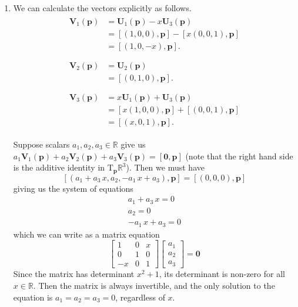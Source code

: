 \documentclass[12 pt, letterpaper]{hmcpset}
\begin{document}
\begin{solution}
	\begin{enumerate}
		\item 
			We can calculate the vectors explicitly as follows.
			\[
				\begin{gathered}
					\begin{split}
						\mathbf V_1(\mathbf p) & = \mathbf U_1(\mathbf p) - x \mathbf U_3(\mathbf p) \\
								       & = [(1, 0, 0), \mathbf p] - [x (0, 0, 1), \mathbf p] \\
								       & = [(1, 0, - x), \mathbf p].
					\end{split}\\\\
					\begin{split}
						\mathbf V_2(\mathbf p) & = \mathbf U_2(\mathbf p) \\
								       & = [(0, 1, 0), \mathbf p].
					\end{split}\\\\
					\begin{split}
						\mathbf V_3(\mathbf p) & = x \mathbf U_1(\mathbf p) + \mathbf U_3(\mathbf p) \\
								       & = [x (1, 0, 0), \mathbf p] + [(0, 0, 1), \mathbf p] \\
								       & = [(x, 0, 1), \mathbf p].
					\end{split}
				\end{gathered}
			\]

			Suppose scalars $a_1, a_2, a_3 \in \mathbb R$ give us $a_1 \mathbf V_1(\mathbf p) + a_2 \mathbf V_2(\mathbf p) + a_3 \mathbf V_3(\mathbf p) = [\mathbf 0, \mathbf p]$ (note that the right hand side is the additive identity in $\mathrm T_{\mathbf p} \mathbb R^3$). Then we must have
			\[
				[(a_1 + a_3 \, x, a_2, - a_1 \, x + a_3), \mathbf p] = [(0, 0, 0), \mathbf p]
			\]
			giving us the system of equations
			\[
				\begin{gathered}
					a_1 + a_3 \, x = 0 \\
					a_2 = 0 \\
					-a_1 \, x + a_3 = 0
				\end{gathered}
			\]
			which we can write as a matrix equation
			\[
				\begin{bmatrix}
					1 & 0 & x \\
					0 & 1 & 0 \\
					-x & 0 & 1
					\end{bmatrix} \begin{bmatrix}
					a_1 \\
					a_2 \\
					a_3
				\end{bmatrix} = \mathbf 0
			\]
			Since the matrix has determinant $x^2 + 1$, its determinant is non-zero for all $x \in \mathbb R$. Then the matrix is always invertible, and the only solution to the equation is $a_1 = a_2 = a_3 = 0$, regardless of $x$.


\end{enumerate}
\end{solution}
\end{document}
